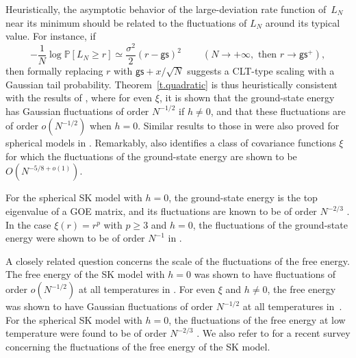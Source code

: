 \documentclass[11pt]{amsart}
\theoremstyle{remark}
\theoremstyle{definition}
\numberwithin{equation}{section}
\numberwithin{proposition}{section}
\numberwithin{figure}{section}
\numberwithin{table}{section}
\renewcommand{\P}{\mathbb{P}}
\renewcommand{\ge}{\geqslant}
\newcommand{\1}{\mathbf{1}}
\newcommand{\msf}{\mathsf}
\begin{document}
Heuristically, the asymptotic behavior of the large-deviation rate function of~$L_N$ near its minimum should be related to the fluctuations of $L_N$ around its typical value. For instance, if 
\begin{equation*}  %
- \frac 1 N \log \P[L_N \ge r] \simeq \frac{\sigma^2}{2} (r-\msf{gs})^2 \ \qquad ( N \to +\infty, \mbox{ then }  r \to \msf{gs}^+), 
\end{equation*}
then formally replacing $r$ with $\msf{gs} + x/\sqrt{N}$ suggests a CLT-type scaling with a Gaussian tail probability. Theorem~\ref{t.quadratic} is thus heuristically consistent with the results of \cite{chen2018energy}, where for even $\xi$, it is shown that the ground-state energy has Gaussian fluctuations of order $N^{-1/2}$ if $h \neq 0$, and that these fluctuations are of order $o(N^{-1/2})$  when $h = 0$. Similar results to those in \cite{chen2018energy} were also proved for spherical models in \cite{chen2017parisi}. Remarkably, \cite[Theorem~8.4]{chatterjee} also identifies a class of covariance functions $\xi$ for which the fluctuations of the ground-state energy are shown to be $O(N^{-5/8 + o(1)})$. 

For the spherical SK model with $h = 0$, the ground-state energy is the top eigenvalue of a GOE matrix, and its fluctuations are known to be of order $N^{-2/3}$ \cite{tracy1996orthogonal}. In the case $\xi(r) = r^p$ with $p \ge 3$ and $h = 0$, the fluctuations of the ground-state energy were shown to be of order $N^{-1}$ in \cite{subag2017extremal}. 


A closely related question concerns the scale of the fluctuations of the free energy.  The free energy of the SK model with $h = 0$ was shown to have fluctuations of order $o(N^{-{1/2}})$ at all temperatures in \cite{chatterjee}. For even $\xi$ and $h \neq 0$, the free energy was shown to have Gaussian fluctuations of order $N^{-1/2}$ at all temperatures in~\cite{chen2017fluctuations}. 
For the spherical SK model with $h = 0$, the fluctuations of the free energy at low temperature were found to be of order $N^{-2/3}$ \cite{baik2016fluctuations}. We also refer to \cite{collins2025free} for a recent survey concerning the fluctuations of the free energy of the SK model.
\end{document}
